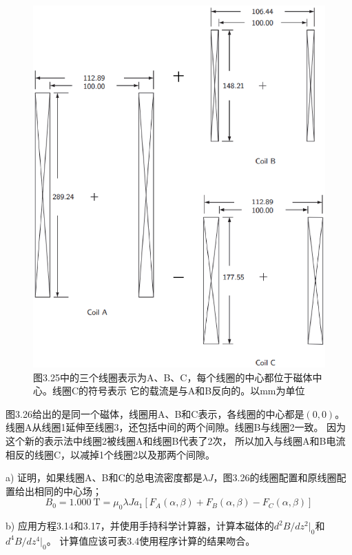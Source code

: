 \begin{figure}[htbp]
	\centering
	\includegraphics[scale=0.7]{chpt3/figs/fig3.26.eps}
	\caption{图3.25中的三个线圈表示为A、B、C，每个线圈的中心都位于磁体中心。线圈C的符号表示
		它的载流是与A和B反向的。以mm为单位}
\end{figure}
图3.26给出的是同一个磁体，线圈用A、B和C表示，各线圈的中心都是$(0,0)$。
线圈A从线圈1延伸至线圈3，还包括中间的两个间隙。线圈B与线圈2一致。
因为这个新的表示法中线圈2被线圈A和线圈B代表了2次，
所以加入与线圈A和B电流相反的线圈C，以减掉1个线圈2以及那两个间隙。

a) 证明，如果线圈A、B和C的总电流密度都是$\lambda J$，图3.26的线圈配置和原线圈配置给出相同的中心场；
\begin{equation} %
B_0 = 1.000\ \mathrm{T}=\mu_0\lambda J a_1[F_A(\alpha,\beta)+F_B(\alpha,\beta)-F_C(\alpha,\beta)]
\end{equation}

b) 应用方程3.14和3.17，并使用手持科学计算器，计算本磁体的$d^2B/dz^2|_0$和$d^4B/dz^4|_0$。
计算值应该可表3.4使用程序计算的结果吻合。

